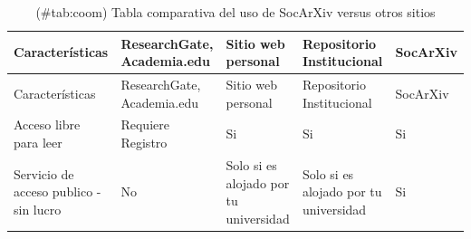 \documentclass[
  spanish,
  letterpaper,
  DIV=11,
  numbers=noendperiod]{scrreprt}
\begin{document}
\begin{longtable}[]{@{}
  >{\raggedright\arraybackslash}p{}
  >{\raggedright\arraybackslash}p{}
  >{\raggedright\arraybackslash}p{}
  >{\raggedright\arraybackslash}p{}
  >{\raggedright\arraybackslash}p{}@{}}
\caption{(\#tab:coom) Tabla comparativa del uso de SocArXiv versus otros
sitios}\tabularnewline
\toprule\noalign{}
\begin{minipage}[b]{\linewidth}\raggedright
Características
\end{minipage} & \begin{minipage}[b]{\linewidth}\raggedright
ResearchGate, Academia.edu
\end{minipage} & \begin{minipage}[b]{\linewidth}\raggedright
Sitio web personal
\end{minipage} & \begin{minipage}[b]{\linewidth}\raggedright
Repositorio Institucional
\end{minipage} & \begin{minipage}[b]{\linewidth}\raggedright
SocArXiv
\end{minipage} \\
\midrule\noalign{}
\endfirsthead
\toprule\noalign{}
\begin{minipage}[b]{\linewidth}\raggedright
Características
\end{minipage} & \begin{minipage}[b]{\linewidth}\raggedright
ResearchGate, Academia.edu
\end{minipage} & \begin{minipage}[b]{\linewidth}\raggedright
Sitio web personal
\end{minipage} & \begin{minipage}[b]{\linewidth}\raggedright
Repositorio Institucional
\end{minipage} & \begin{minipage}[b]{\linewidth}\raggedright
SocArXiv
\end{minipage} \\
\midrule\noalign{}
\endhead
\bottomrule\noalign{}
\endlastfoot
Acceso libre para leer & Requiere Registro & Si & Si & Si \\
Servicio de acceso publico - sin lucro & No & Solo si es alojado por tu
universidad & Solo si es alojado por tu universidad & Si \\

\end{longtable}
\end{document}
